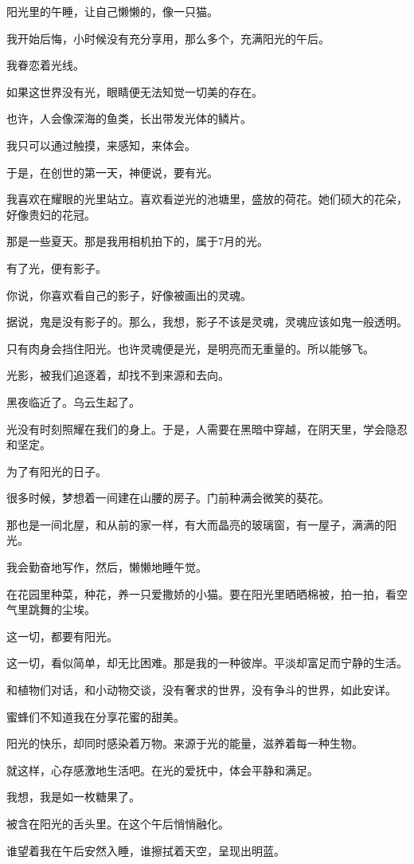 		阳光里的午睡，让自己懒懒的，像一只猫。\par
		我开始后悔，小时候没有充分享用，那么多个，充满阳光的午后。

		我眷恋着光线。\par
		如果这世界没有光，眼睛便无法知觉一切美的存在。\par
		也许，人会像深海的鱼类，长出带发光体的鳞片。\par
		我只可以通过触摸，来感知，来体会。\par
		于是，在创世的第一天，神便说，要有光。\par
		我喜欢在耀眼的光里站立。喜欢看逆光的池塘里，盛放的荷花。她们硕大的花朵，好像贵妇的花冠。\par
		那是一些夏天。那是我用相机拍下的，属于7月的光。\par
		有了光，便有影子。\par
		你说，你喜欢看自己的影子，好像被画出的灵魂。\par
		据说，鬼是没有影子的。那么，我想，影子不该是灵魂，灵魂应该如鬼一般透明。\par
		只有肉身会挡住阳光。也许灵魂便是光，是明亮而无重量的。所以能够飞。\par
		光影，被我们追逐着，却找不到来源和去向。\par
		黑夜临近了。乌云生起了。\par
		光没有时刻照耀在我们的身上。于是，人需要在黑暗中穿越，在阴天里，学会隐忍和坚定。

		为了有阳光的日子。

		很多时候，梦想着一间建在山腰的房子。门前种满会微笑的葵花。\par
		那也是一间北屋，和从前的家一样，有大而晶亮的玻璃窗，有一屋子，满满的阳光。\par
		我会勤奋地写作，然后，懒懒地睡午觉。\par
		在花园里种菜，种花，养一只爱撒娇的小猫。要在阳光里晒晒棉被，拍一拍，看空气里跳舞的尘埃。\par
		这一切，都要有阳光。\par
		这一切，看似简单，却无比困难。那是我的一种彼岸。平淡却富足而宁静的生活。\par
		和植物们对话，和小动物交谈，没有奢求的世界，没有争斗的世界，如此安详。

		蜜蜂们不知道我在分享花蜜的甜美。\par
		阳光的快乐，却同时感染着万物。来源于光的能量，滋养着每一种生物。\par
		就这样，心存感激地生活吧。在光的爱抚中，体会平静和满足。\par
		我想，我是如一枚糖果了。\par
		被含在阳光的舌头里。在这个午后悄悄融化。\par
		谁望着我在午后安然入睡，谁擦拭着天空，呈现出明蓝。

